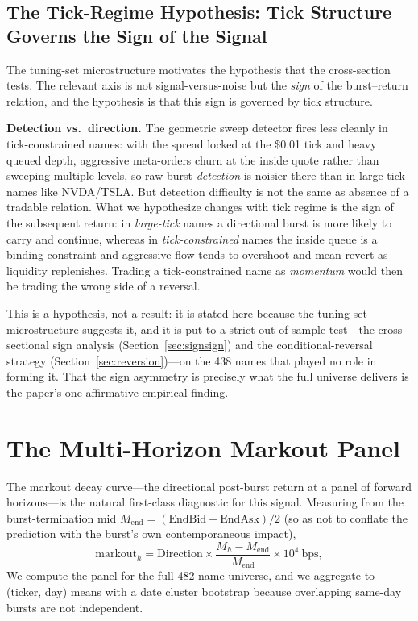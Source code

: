 \documentclass[11pt]{article}
\begin{document}
\subsection{The Tick-Regime Hypothesis: Tick Structure Governs the Sign of the Signal}
\label{sec:synthesis}
The tuning-set microstructure motivates the hypothesis that the cross-section tests. The relevant axis is not signal-versus-noise but the \emph{sign} of the burst--return relation, and the hypothesis is that this sign is governed by tick structure.

\textbf{Detection vs.\ direction.} The geometric sweep detector fires less cleanly in tick-constrained names: with the spread locked at the \$0.01 tick and heavy queued depth, aggressive meta-orders churn at the inside quote rather than sweeping multiple levels, so raw burst \emph{detection} is noisier there than in large-tick names like NVDA/TSLA. But detection difficulty is not the same as absence of a tradable relation. What we hypothesize changes with tick regime is the sign of the subsequent return: in \emph{large-tick} names a directional burst is more likely to carry and continue, whereas in \emph{tick-constrained} names the inside queue is a binding constraint and aggressive flow tends to overshoot and mean-revert as liquidity replenishes. Trading a tick-constrained name as \emph{momentum} would then be trading the wrong side of a reversal.

This is a hypothesis, not a result: it is stated here because the tuning-set microstructure suggests it, and it is put to a strict out-of-sample test---the cross-sectional sign analysis (Section~\ref{sec:signsign}) and the conditional-reversal strategy (Section~\ref{sec:reversion})---on the 438 names that played no role in forming it. That the sign asymmetry is precisely what the full universe delivers is the paper's one affirmative empirical finding.

\section{The Multi-Horizon Markout Panel}
\label{sec:markout}
The markout decay curve---the directional post-burst return at a panel of forward horizons---is the natural first-class diagnostic for this signal. Measuring from the burst-termination mid $M_{\text{end}}=(\text{EndBid}+\text{EndAsk})/2$ (so as not to conflate the prediction with the burst's own contemporaneous impact),
\[
\text{markout}_h = \text{Direction}\times \frac{M_h - M_{\text{end}}}{M_{\text{end}}}\times 10^4 \ \text{bps},
\]
We compute the panel for the full 482-name universe, and we aggregate to (ticker, day) means with a date cluster bootstrap because overlapping same-day bursts are not independent.
\end{document}
